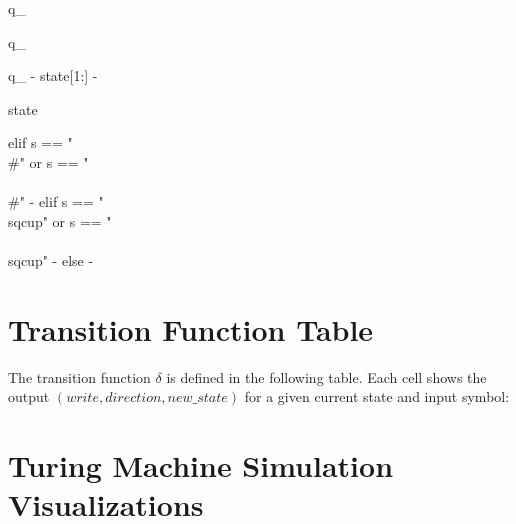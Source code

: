 {%
{%
q_{}
{%
q_{}
{%
q_{ {{- state[1:] -}} }
{%
{{ state }}
{%
{%

{%
{%
 elif s == "\\#" or s == "\\\\#" -%
 elif s == "\\sqcup" or s == "\\\\sqcup" -%
 else -%
{%
{%
{%
\Sym{\#}
{%
\Sym{\ensuremath{\sqcup}}
{%
{%
{%
{%
{%
{%

\def\Sym#1{\texttt{\color{BrickRed}#1}}

\section{Transition Function Table}

The transition function $\delta$ is defined in the following table. Each cell shows the output $(write, direction, new\_state)$ for a given current state and input symbol:

\begin{table}[htbp]
\centering
\small
{}
\caption{Complete Transition Function For The Turing Machine}
\end{table}

\section{Turing Machine Simulation Visualizations}

}}}}}}}}}}}}}}}}}}}
